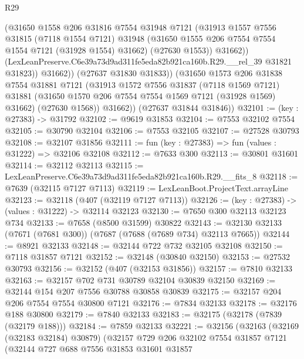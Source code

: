 \begin{lexlean}{R29}
\begin{coremodule}
                  (@31650
                    @1558
                    @206
                    @31816
                    @7554
                    @31948
                    @7121
                    (@31913
                      @1557
                      @7556
                      @31815
                      (@7118 @1554 @7121)
                      @31948
                      (@31650 @1555 @206 @7554 @7554 @1554 @7121 (@31928 @1554) @31662)
                      (@27630 @1553))
                    @31662))
                (LexLeanPreserve.C6e39a73d9ad311fe5eda82b921ca160b.R29.__rel_39 @31821 @31823))
              @31662))
          (@27637 @31830 @31833))
        (@31650
          @1573
          @206
          @31838
          @7554
          @31881
          @7121
          (@31913
            @1572
            @7556
            @31837
            (@7118 @1569 @7121)
            @31881
            (@31650 @1570 @206 @7554 @7554 @1569 @7121 (@31928 @1569) @31662)
            (@27630 @1568))
          @31662))
      (@27637 @31844 @31846))
@32101 := (key : @27383) -> @31792
@32102 := @9619 @31853
@32104 := @7553 @32102 @7554
@32105 := @30790 @32104
@32106 := @7553 @32105
@32107 := @27528 @30793
@32108 := @32107 @31856
@32111 := fun (key : @27383) => fun (values : @31222) => @32106 @32108
@32112 := @7633 @300
@32113 := @30801 @31601
@32114 := @32112 @32113
@32115 := LexLeanPreserve.C6e39a73d9ad311fe5eda82b921ca160b.R29.__fits_8
@32118 := @7639 (@32115 @7127 @7113)
@32119 := LexLeanBoot.ProjectText.arrayLine
@32123 := @32118 (@407 (@32119 @7127 @7113))
@32126 := (key : @27383) -> (values : @31222) -> @32114 @32123
@32130 := @7650 @300 @32113 @32123 @734
@32133 := @7658 (@8500 @31599) @30822
@32143 := @32130 @32133 (@7671 (@7681 @300)) (@7687 (@7688 (@7689 @734) @32113 @7665))
@32144 := @8921 @32133
@32148 := @32144 @722 @732 @32105 @32108
@32150 := @7118 @31857 @7121
@32152 := @32148 (@30840 @32150)
@32153 := @27532 @30793
@32156 := @32152 (@407 (@32153 @31856))
@32157 := @7810 @32133
@32163 := @32157 @702 @731 @30789 @32104 @30839 @32150
@32169 := @32144 @154 @207 @7556 @30788 @30858 @30839
@32175 := @32157 @204 @206 @7554 @7554 @30800 @7121
@32176 := @7834 @32133
@32178 := @32176 @188 @30800
@32179 := @7840 @32133
@32183 := @32175 (@32178 (@7839 (@32179 @188)))
@32184 := @7859 @32133
@32221 := @32156
    (@32163
      (@32169 (@32183 @32184) @30879)
      (@32157
        @729
        @206
        @32102
        @7554
        @31857
        @7121
        (@32144
          @727
          @688
          @7556
          @31853
          @31601
          @31857

\end{coremodule}
\end{lexlean}

